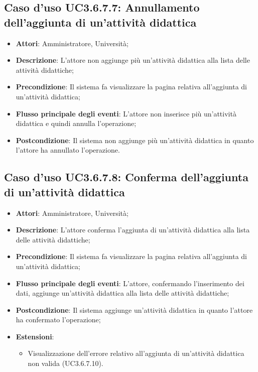 \subsection{Caso d'uso \texorpdfstring{UC3.6.7.7}{UC3.6.7.7}: Annullamento dell’aggiunta di un’attività didattica}
\begin{itemize}
	\item \textbf{Attori}: Amministratore, Università;
	\item \textbf{Descrizione}: L'attore non aggiunge più un'attività didattica alla lista delle attività didattiche;
	
	\item \textbf{Precondizione}: Il sistema fa visualizzare la pagina relativa all'aggiunta di un'attività didattica;
	
	\item \textbf{Flusso principale degli eventi}: L'attore non inserisce più un'attività didattica e quindi annulla l'operazione;
	
	\item \textbf{Postcondizione}: Il sistema non aggiunge più un'attività didattica in quanto l'attore ha annullato l'operazione.
\end{itemize}
\subsection{Caso d'uso \texorpdfstring{UC3.6.7.8}{UC3.6.7.8}: Conferma dell’aggiunta di un’attività didattica}
\begin{itemize}
	\item \textbf{Attori}: Amministratore, Università;
	\item \textbf{Descrizione}: L'attore conferma l'aggiunta di un’attività didattica alla lista delle attività didattiche;
	
	\item \textbf{Precondizione}: Il sistema fa visualizzare la pagina relativa all'aggiunta di un’attività didattica;
	
	\item \textbf{Flusso principale degli eventi}: L'attore, confermando l'inserimento dei dati, aggiunge un’attività didattica alla lista delle attività didattiche;
	
	\item \textbf{Postcondizione}: Il sistema aggiunge un'attività didattica in quanto l'attore ha confermato l'operazione;
	
	\item \textbf{Estensioni}:
	\begin{itemize}
		\item Visualizzazione dell'errore relativo all’aggiunta di un’attività didattica non valida (UC3.6.7.10).
	\end{itemize}
\end{itemize}
